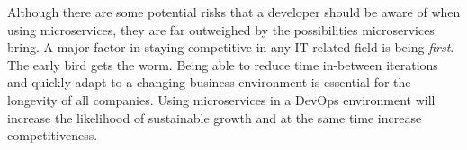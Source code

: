 \documentclass[a4paper]{article}
\begin{document}
Although there are some potential risks that a developer should be aware of when using microservices, they are far outweighed by the possibilities microservices bring. A major factor in staying competitive in any IT-related field is being \textit{first}. The early bird gets the worm. Being able to reduce time in-between iterations and quickly adapt to a changing business environment is essential for the longevity of all companies. Using microservices in a DevOps environment will increase the likelihood of sustainable growth and at the same time increase competitiveness.


\newpage
\printbibliography
\end{document}
